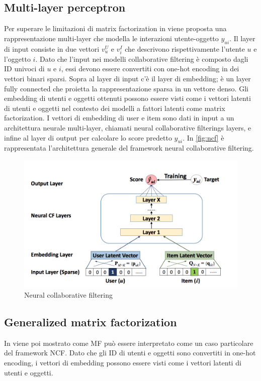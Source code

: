 \documentclass[12pt,italian]{report}
\begin{document}
\subsection{Multi-layer perceptron}
Per superare le limitazioni di matrix factorization in \cite{NCF} viene proposta una rappresentazione multi-layer che modella le interazioni utente-oggetto $y_{ui}$. Il layer di input consiste in due vettori $v_u^U$ e $v_i^I$ che descrivono rispettivamente l'utente $u$ e l'oggetto $i$. Dato che l'input nei modelli collaborative filtering è composto dagli ID univoci di $u$ e $i$, essi devono essere convertiti con one-hot encoding in dei vettori binari sparsi.
Sopra al layer di input c'è il layer di embedding; è un layer fully connected che proietta la rappresentazione sparsa in un vettore denso.
Gli embedding di utenti e oggetti ottenuti possono essere visti come i vettori latenti di utenti e oggetti nel contesto dei modelli a fattori latenti come matrix factorization.
I vettori di embedding di user e item sono dati in input a un architettura neurale multi-layer, chiamati neural collaborative filterings layers, e infine al layer di output per calcolare lo score predetto $y_{ui}$. In \autoref{fig:ncf} è rappresentata l'architettura generale del framework neural collaborative filtering.

\begin{figure}
  \includegraphics[width=\linewidth]{immagini/ncf.png}
  \caption{Neural collaborative filtering}
  \label{fig:ncf}
\end{figure}

\subsection{Generalized matrix factorization}
In \cite{NCF} viene poi mostrato come MF può essere interpretato come un caso particolare del framework NCF. Dato che gli ID di utenti e oggetti sono convertiti in one-hot encoding, i vettori di embedding possono essere visti come i vettori latenti di utenti e oggetti.
\end{document}
